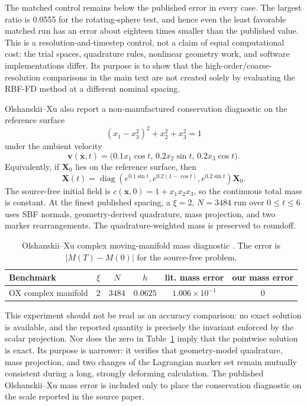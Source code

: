 \documentclass[a4paper,fleqn]{cas-sc}
\begin{document}
The matched control remains below the published error in every case.  The
largest ratio is 0.0555 for the rotating-sphere test, and hence even the least
favorable matched run has an error about eighteen times smaller than the
published value.  This is a resolution-and-timestep control, not a claim of
equal computational cost: the trial spaces, quadrature rules, nonlinear
geometry work, and software implementations differ.  Its purpose is to show
that the high-order/coarse-resolution comparisons in the main text are not
created solely by evaluating the RBF-FD method at a different nominal spacing.

Olshanskii--Xu also report a non-manufactured conservation diagnostic on the
reference surface
\[
  (x_1-x_3^2)^2+x_2^2+x_3^2=1
\]
under the ambient velocity
\[
  \bm v(\bm x,t)
  =
  \bigl(0.1x_1\cos t,\,0.2x_2\sin t,\,0.2x_3\cos t\bigr).
\]
Equivalently, if \(\bm X_0\) lies on the reference surface, then
\[
  \bm X(t)
  =
  \operatorname{diag}\!\left(
    e^{0.1\sin t},
    e^{0.2(1-\cos t)},
    e^{0.2\sin t}
  \right)\bm X_0.
\]
The source-free initial field is
\(c(\bm x,0)=1+x_1x_2x_3\), so the continuous total mass is constant.  At the
finest published spacing, a \(\xi=2\), \(N=3484\) run over \(0\le t\le6\)
uses SBF normals, geometry-derived quadrature, mass projection, and two marker
rearrangements.  The quadrature-weighted mass is preserved to roundoff.

\begin{table}[!htbp]
\centering
\caption{Olshanskii--Xu complex moving-manifold mass diagnostic
\cite{OlshanskiiXu2017TraceFEM}.  The error is
\(|M(T)-M(0)|\) for the source-free problem.}
\scriptsize
\setlength{\tabcolsep}{3pt}
\label{tab:ox-complex-mass}
\begin{tabular}{l c c c c c}
\toprule
Benchmark & \(\xi\) & \(N\) & \(h\) &
lit. mass error & our mass error \\
\midrule
OX complex manifold & \(2\) & \(3484\) & \(0.0625\) &
\(1.006{\times}10^{-1}\) & \(0\) \\
\bottomrule
\end{tabular}
\end{table}

This experiment should not be read as an accuracy comparison: no exact
solution is available, and the reported quantity is precisely the invariant
enforced by the scalar projection.  Nor does the zero in
Table~\ref{tab:ox-complex-mass} imply that the pointwise solution is exact.  Its
purpose is narrower: it verifies that geometry-model quadrature, mass
projection, and two changes of the Lagrangian marker set remain mutually
consistent during a long, strongly deforming calculation.  The published
Olshanskii--Xu mass error is included only to place the conservation diagnostic
on the scale reported in the source paper.




\end{document}
